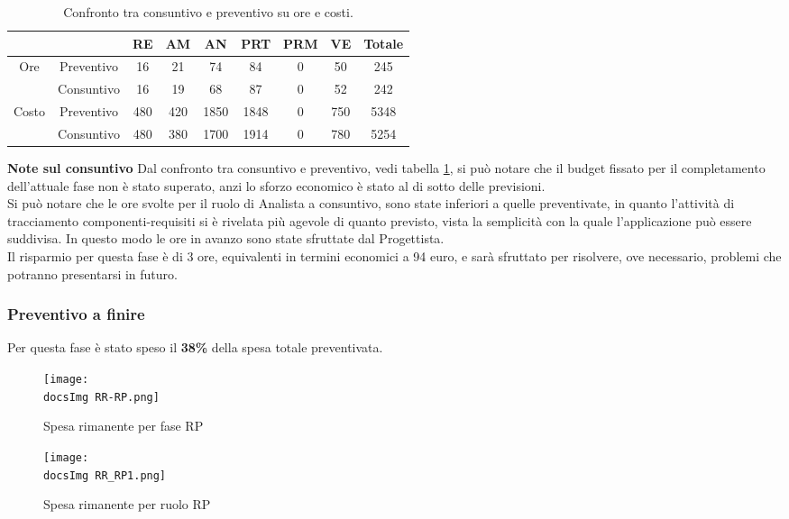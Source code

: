 {{{	\newpage
	\begin{table}[h!]
		\begin{center}
			\renewcommand{\arraystretch}{1.5}%
			\begin{tabular}{c| c c c c c c c |c }
				\toprule
				\multicolumn{2}{c}{}&	RE& AM& AN& PRT& PRM& VE& Totale \\ 
				\midrule
				\multirow{2}{*}{Ore}	& Preventivo	& 16	& 21	& 74  	& 84 	& 0 	& 50	& 245\\ 
							& Consuntivo	& 16 	& 19 	& 68	& 87 	& 0 	& 52	& 242\\ \hline
				\multirow{2}{*}{Costo}	& Preventivo	& 480	& 420	& 1850 	& 1848 	& 0 	& 750	& 5348\\ 
							& Consuntivo	& 480	& 380 	& 1700  & 1914 	& 0	& 780	& 5254\\
				\bottomrule
			\end{tabular}
		\end{center}
		\caption{Confronto tra consuntivo e preventivo su ore e costi.}
		\label{rc_RR-RP}
	\end{table}

\textbf{Note sul consuntivo}{
Dal confronto tra consuntivo e preventivo, vedi tabella \ref{rc_RR-RP}, si può notare che il budget fissato per il completamento dell'attuale fase non è stato superato, anzi lo sforzo economico è stato al di sotto delle previsioni.\\
Si può notare che le ore svolte per il ruolo di Analista a consuntivo, sono state inferiori a quelle preventivate, in quanto l'attività di tracciamento componenti-requisiti si è rivelata più agevole di quanto previsto, vista la semplicità con la quale l'applicazione può essere suddivisa. In questo modo le ore in avanzo sono state sfruttate dal Progettista.\\
Il risparmio per questa fase è di 3 ore, equivalenti in termini economici a 94 euro, e sarà sfruttato per risolvere, ove necessario, problemi che potranno presentarsi in futuro.
	  }
	 }
	 \subsubsection{Preventivo a finire}{
	 Per questa fase è stato speso il \textbf{38\%} della spesa totale preventivata.
		 	\begin{figure}[h!]
	\centering
		\texttt{[image: \\docsImg RR-RP.png]}
		\caption{Spesa rimanente per fase RP}  	
	\end{figure}
	\newpage
	\begin{figure}[h!]
	\centering
		\texttt{[image: \\docsImg RR\_RP1.png]}
		\caption{Spesa rimanente per ruolo RP} 
	

\end{figure}}}}

